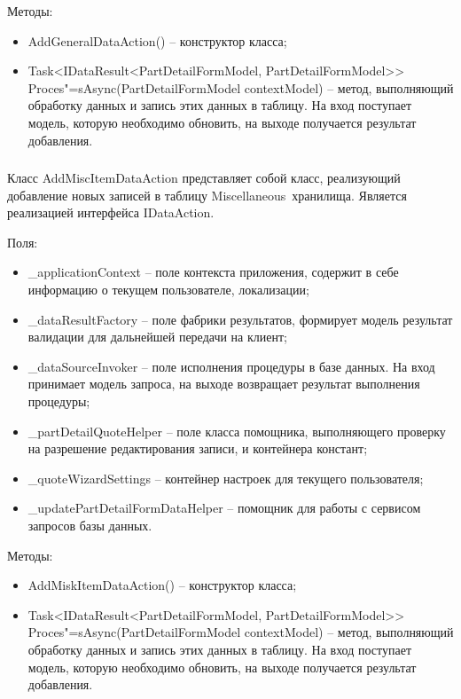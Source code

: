 Методы:
\begin{itemize}
  \item AddGeneralDataAction() – конструктор класса;
  \item Task<IDataResult<PartDetailFormModel, PartDetailFormModel>> Proces"=sAsync(PartDetailFormModel contextModel) – метод, выполняющий обработку данных и запись этих данных в таблицу. На вход поступает модель, которую необходимо обновить, на выходе получается результат добавления.
\end{itemize}

\subsubsection{}
\label{sub:arch_and_mod:data_layer:add_misc_item}

Класс AddMiscItemDataAction представляет собой класс, реализующий добавление новых записей в таблицу Miscellaneous хранилища. Является реализацией интерфейса IDataAction.

Поля:
\begin{itemize}
  \item \_applicationContext – поле контекста приложения, содержит в себе информацию о текущем пользователе, локализации;
  \item \_dataResultFactory – поле фабрики результатов, формирует модель результат валидации для дальнейшей передачи на клиент;
  \item \_dataSourceInvoker – поле исполнения процедуры в базе данных. На вход принимает модель запроса, на выходе возвращает результат выполнения процедуры;
  \item \_partDetailQuoteHelper – поле класса помощника, выполняющего проверку на разрешение редактирования записи, и контейнера констант;
  \item \_quoteWizardSettings – контейнер настроек для текущего пользователя;
  \item \_updatePartDetailFormDataHelper – помощник для работы с сервисом запросов базы данных.
\end{itemize}

Методы:
\begin{itemize}
  \item AddMiskItemDataAction() – конструктор класса;
  \item Task<IDataResult<PartDetailFormModel, PartDetailFormModel>> Proces"=sAsync(PartDetailFormModel contextModel) – метод, выполняющий обработку данных и запись этих данных в таблицу. На вход поступает модель, которую необходимо обновить, на выходе получается результат добавления.
\end{itemize}

